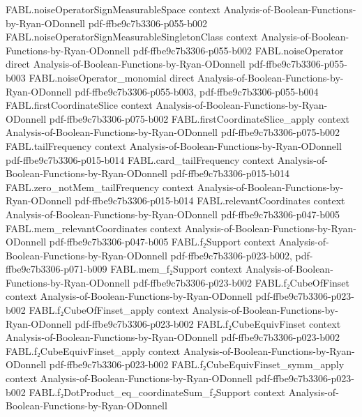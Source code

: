 \begin{theorem}
\proofstep
  {FABL.noiseOperatorSignMeasurableSpace}
  {context}
  {Analysis-of-Boolean-Functions-by-Ryan-ODonnell}
  {pdf-ffbe9c7b3306-p055-b002}
\proofstep
  {FABL.noiseOperatorSignMeasurableSingletonClass}
  {context}
  {Analysis-of-Boolean-Functions-by-Ryan-ODonnell}
  {pdf-ffbe9c7b3306-p055-b002}
\proofstep
  {FABL.noiseOperator}
  {direct}
  {Analysis-of-Boolean-Functions-by-Ryan-ODonnell}
  {pdf-ffbe9c7b3306-p055-b003}
\proofstep
  {FABL.noiseOperator_monomial}
  {direct}
  {Analysis-of-Boolean-Functions-by-Ryan-ODonnell}
  {pdf-ffbe9c7b3306-p055-b003,
    pdf-ffbe9c7b3306-p055-b004}
\proofstep
  {FABL.firstCoordinateSlice}
  {context}
  {Analysis-of-Boolean-Functions-by-Ryan-ODonnell}
  {pdf-ffbe9c7b3306-p075-b002}
\proofstep
  {FABL.firstCoordinateSlice_apply}
  {context}
  {Analysis-of-Boolean-Functions-by-Ryan-ODonnell}
  {pdf-ffbe9c7b3306-p075-b002}
\proofstep
  {FABL.tailFrequency}
  {context}
  {Analysis-of-Boolean-Functions-by-Ryan-ODonnell}
  {pdf-ffbe9c7b3306-p015-b014}
\proofstep
  {FABL.card_tailFrequency}
  {context}
  {Analysis-of-Boolean-Functions-by-Ryan-ODonnell}
  {pdf-ffbe9c7b3306-p015-b014}
\proofstep
  {FABL.zero_notMem_tailFrequency}
  {context}
  {Analysis-of-Boolean-Functions-by-Ryan-ODonnell}
  {pdf-ffbe9c7b3306-p015-b014}
\proofstep
  {FABL.relevantCoordinates}
  {context}
  {Analysis-of-Boolean-Functions-by-Ryan-ODonnell}
  {pdf-ffbe9c7b3306-p047-b005}
\proofstep
  {FABL.mem_relevantCoordinates}
  {context}
  {Analysis-of-Boolean-Functions-by-Ryan-ODonnell}
  {pdf-ffbe9c7b3306-p047-b005}
\proofstep
  {FABL.f₂Support}
  {context}
  {Analysis-of-Boolean-Functions-by-Ryan-ODonnell}
  {pdf-ffbe9c7b3306-p023-b002,
    pdf-ffbe9c7b3306-p071-b009}
\proofstep
  {FABL.mem_f₂Support}
  {context}
  {Analysis-of-Boolean-Functions-by-Ryan-ODonnell}
  {pdf-ffbe9c7b3306-p023-b002}
\proofstep
  {FABL.f₂CubeOfFinset}
  {context}
  {Analysis-of-Boolean-Functions-by-Ryan-ODonnell}
  {pdf-ffbe9c7b3306-p023-b002}
\proofstep
  {FABL.f₂CubeOfFinset_apply}
  {context}
  {Analysis-of-Boolean-Functions-by-Ryan-ODonnell}
  {pdf-ffbe9c7b3306-p023-b002}
\proofstep
  {FABL.f₂CubeEquivFinset}
  {context}
  {Analysis-of-Boolean-Functions-by-Ryan-ODonnell}
  {pdf-ffbe9c7b3306-p023-b002}
\proofstep
  {FABL.f₂CubeEquivFinset_apply}
  {context}
  {Analysis-of-Boolean-Functions-by-Ryan-ODonnell}
  {pdf-ffbe9c7b3306-p023-b002}
\proofstep
  {FABL.f₂CubeEquivFinset_symm_apply}
  {context}
  {Analysis-of-Boolean-Functions-by-Ryan-ODonnell}
  {pdf-ffbe9c7b3306-p023-b002}
\proofstep
  {FABL.f₂DotProduct_eq_coordinateSum_f₂Support}
  {context}
  {Analysis-of-Boolean-Functions-by-Ryan-ODonnell}

\end{theorem}
